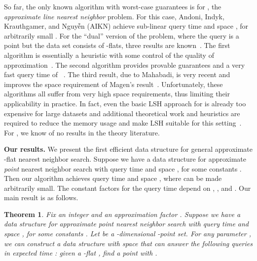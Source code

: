\documentclass[a4paper,11pt]{paper}
\newtheorem{theorem} {Theorem}[section]
\begin{document}
So far, the only known algorithm with
worst-case guarantees is for , the
\emph{approximate line nearest neighbor}
problem. For this case, Andoni, Indyk,
Krauthgamer, and Nguy\~{\^{e}}n (AIKN) achieve
sub-linear query time 
and space ,
for arbitrarily small . For the
``dual'' version of the problem, where
the query is a point but the data set
consists of -flats, three results are
known~\cite{BasriHaZe07,Mahabadi15,Magen07}. The
first algorithm is essentially a
heuristic with some control of the
quality of
approximation~\cite{BasriHaZe07}.
The second algorithm provides
provable guarantees and a very fast
query time of
~\cite{Magen07}.
The third result, due to Mahabadi, is very recent
and improves the space requirement of Magen's
result~\cite{Mahabadi15}. Unfortunately, these algorithms
all suffer from very high space requirements, thus limiting
their applicability in practice. In fact, even the basic LSH
approach for  is already too expensive for large
datasets and additional theoretical work and heuristics are
required to reduce the memory usage and make LSH suitable
for this setting~\cite{Panigrahy06,LvJoWaChLi07}.
For , we know of no results in the
theory literature.

\noindent
\textbf{Our results.}
We present the first efficient data structure
for general approximate -flat nearest
neighbor search. Suppose we have a data structure
for approximate \emph{point} nearest neighbor
search with query time  and space
, for some constants .
Then our algorithm achieves
query time 
and space
, where
 can be made arbitrarily small.
The constant factors for the query time depend on
, , and . Our main result is as follows.

\begin{theorem}\label{thm:main}
  Fix an integer  and an approximation factor .
  Suppose we have a data structure
  for approximate \emph{point} nearest neighbor
  search with query time  and space
  , for some constants .
  Let  be a -dimensional -point set.
  For any parameter , we
  can construct a data structure with
   space
  that can answer the following queries in
  expected time :
  given a -flat , find a point 
  with .
\end{theorem}
\end{document}

